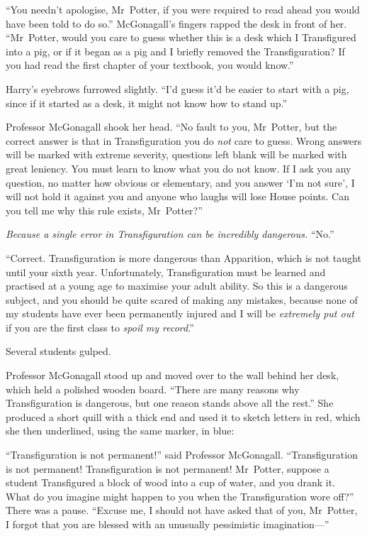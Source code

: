 “You needn’t apologise, Mr~Potter, if you were required to read ahead you
would have been told to do so.” McGonagall’s fingers rapped the desk in front
of her. “Mr~Potter, would you care to guess whether this is a desk which I
Transfigured into a pig, or if it began as a pig and I briefly removed the
Transfiguration? If you had read the first chapter of your textbook, you would
know.”

Harry’s eyebrows furrowed slightly. “I’d guess it’d be easier to start with a
pig, since if it started as a desk, it might not know how to stand up.”

Professor McGonagall shook her head. “No fault to you, Mr~Potter, but the
correct answer is that in Transfiguration you do \emph{not} care to guess.
Wrong answers will be marked with extreme severity, questions left blank will
be marked with great leniency. You must learn to know what you do not know. If
I ask you any question, no matter how obvious or elementary, and you answer
‘I’m not sure’, I will not hold it against you and anyone who laughs will lose
House points. Can you tell me why this rule exists, Mr~Potter?”

\emph{Because a single error in Transfiguration can be incredibly dangerous.}
“No.”

“Correct. Transfiguration is more dangerous than Apparition, which is not
taught until your sixth year. Unfortunately, Transfiguration must be learned
and practised at a young age to maximise your adult ability. So this is a
dangerous subject, and you should be quite scared of making any mistakes,
because none of my students have ever been permanently injured and I will be
\emph{extremely put out} if you are the first class to \emph{spoil my record}.”

Several students gulped.

Professor McGonagall stood up and moved over to the wall behind her desk, which
held a polished wooden board. “There are many reasons why Transfiguration is
dangerous, but one reason stands above all the rest.” She produced a short
quill with a thick end and used it to sketch letters in red, which she then
underlined, using the same marker, in blue:


“Transfiguration is not permanent!” said Professor McGonagall. “Transfiguration
is not permanent! Transfiguration is not permanent! Mr~Potter, suppose a
student Transfigured a block of wood into a cup of water, and you drank it.
What do you imagine might happen to you when the Transfiguration wore off?”
There was a pause. “Excuse me, I should not have asked that of you, Mr~Potter,
I forgot that you are blessed with an unusually pessimistic imagination—”

